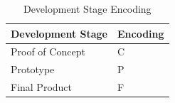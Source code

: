 \bgroup
\def\arraystretch{1.5}
\begin{table}[H]
\centering
\begin{tabular}{ | m{7cm} | m{7cm}| } 
\hline
\rowcolor{lightgray} \textbf{Development Stage} & \textbf{Encoding} \\ 
\hline
Proof of Concept & C\\ 
\hline
Prototype & P\\ 
\hline
Final Product & F\\  
\hline
\end{tabular}
\caption{Development Stage Encoding}
\end{table}	
	
	
%



















